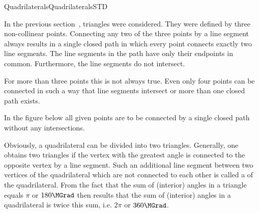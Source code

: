 \begin{MXContent}{Quadrilaterals}{Quadrilaterals}{STD}

In the previous section~, triangles were considered.
They were defined by three non-collinear points. Connecting any two of the three points 
by a line segment always results in a single closed path in which
every point connects exactly two line segments. The line segments in the path
have only their endpoints in common. Furthermore, the line segments do not intersect. 

For more than three points this is not always true. Even only four points 
can be connected in such a way that line segments intersect or more than one
closed path exists.

In the figure below all given points are to be connected by a single closed path 
without any intersections.

\begin{center}
\end{center}

Obviously, a quadrilateral can be divided into two triangles. Generally, one 
obtains two triangles if the vertex with the greatest angle is connected to 
the opposite vertex by a line segment. Such an additional line segment between 
two vertices of the quadrilateral which are not connected to each other is called a 
 of the quadrilateral. From the fact that 
the sum of (interior) angles in a triangle equals $\pi$ or $180\MGrad$ 
then results that the sum of (interior) angles in a quadrilateral is twice 
this sum, i.e. $2 \pi$ or $360\MGrad$. 



\end{MXContent}
